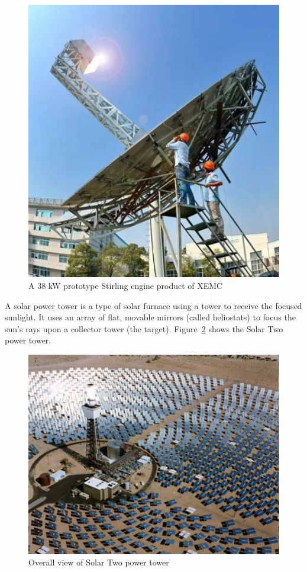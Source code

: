 \begin{figure}[!ht]
\centering
\includegraphics[width=.8\textwidth]{fig/ParabolicDish}
\caption{A 38 kW prototype Stirling engine product of XEMC}\label{fig:pd}
\end{figure}

A solar power tower is a type of solar furnace using a tower to receive the focused sunlight. It uses an array of flat, movable mirrors (called heliostats) to focus the sun's rays upon a collector tower (the target). Figure~\ref{fig:spt} shows the Solar Two power tower.

\begin{figure}[!ht]
\centering
\includegraphics[width=.8\textwidth]{fig/PowerTower}
\caption{Overall view of Solar Two power tower}\label{fig:spt}
\end{figure}

